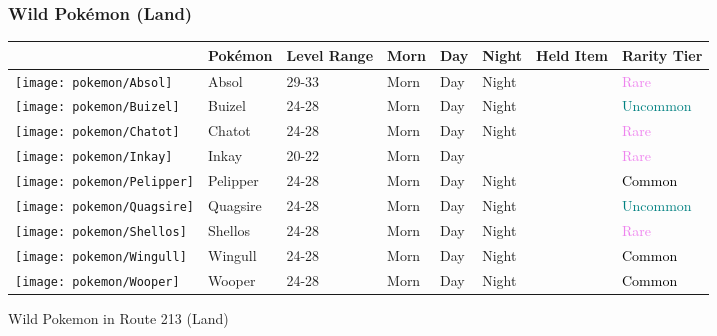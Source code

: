 \subsubsection{Wild Pokémon (Land)}%
\label{ssubsec:WildPokmon(Land)}%
\begin{longtable}{||l l l l l l l l||}%
\hline%
&Pokémon&Level Range&Morn&Day&Night&Held Item&Rarity Tier\\%
\hline%
\endhead%
\hline%
\texttt{[image: pokemon/Absol]}&Absol&29{-}33&Morn&Day&Night&&\textcolor{violet}{%
Rare%
}\\%
\hline%
\texttt{[image: pokemon/Buizel]}&Buizel&24{-}28&Morn&Day&Night&&\textcolor{teal}{%
Uncommon%
}\\%
\hline%
\texttt{[image: pokemon/Chatot]}&Chatot&24{-}28&Morn&Day&Night&&\textcolor{violet}{%
Rare%
}\\%
\hline%
\texttt{[image: pokemon/Inkay]}&Inkay&20{-}22&Morn&Day&&&\textcolor{violet}{%
Rare%
}\\%
\hline%
\texttt{[image: pokemon/Pelipper]}&Pelipper&24{-}28&Morn&Day&Night&&\textcolor{black}{%
Common%
}\\%
\hline%
\texttt{[image: pokemon/Quagsire]}&Quagsire&24{-}28&Morn&Day&Night&&\textcolor{teal}{%
Uncommon%
}\\%
\hline%
\texttt{[image: pokemon/Shellos]}&Shellos&24{-}28&Morn&Day&Night&&\textcolor{violet}{%
Rare%
}\\%
\hline%
\texttt{[image: pokemon/Wingull]}&Wingull&24{-}28&Morn&Day&Night&&\textcolor{black}{%
Common%
}\\%
\hline%
\texttt{[image: pokemon/Wooper]}&Wooper&24{-}28&Morn&Day&Night&&\textcolor{black}{%
Common%
}\\%
\hline%
\end{longtable}%
\caption{Wild Pokemon in Route 213 (Land)}